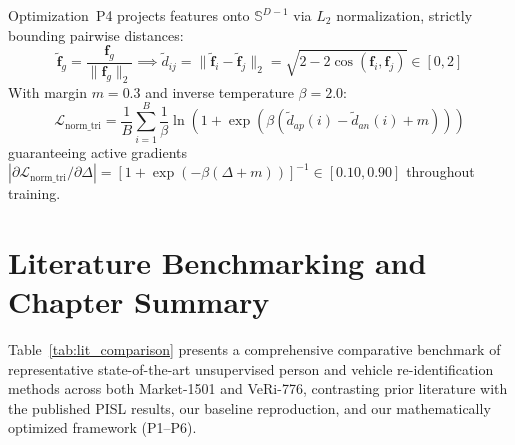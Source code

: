 Optimization~P4 projects features onto $\mathbb{S}^{D-1}$ via $L_2$ normalization, strictly bounding pairwise distances:
\begin{equation}
\label{eq:lit_l2_norm}
\tilde{\mathbf{f}}_g = \frac{\mathbf{f}_g}{\|\mathbf{f}_g\|_2} \implies \tilde{d}_{ij} = \|\tilde{\mathbf{f}}_i - \tilde{\mathbf{f}}_j\|_2 = \sqrt{2 - 2\cos(\mathbf{f}_i, \mathbf{f}_j)} \in [0, 2]
\end{equation}
With margin $m = 0.3$ and inverse temperature $\beta = 2.0$:
\begin{equation}
\label{eq:lit_norm_triplet_loss}
\mathcal{L}_{\text{norm\_tri}} = \frac{1}{B}\sum_{i=1}^B \frac{1}{\beta}\ln\left(1 + \exp\left(\beta(\tilde{d}_{ap}(i) - \tilde{d}_{an}(i) + m)\right)\right)
\end{equation}
guaranteeing active gradients $|\partial \mathcal{L}_{\text{norm\_tri}} / \partial \Delta| = [1 + \exp(-\beta(\Delta + m))]^{-1} \in [0.10, 0.90]$ \label{eq:lit_active_gradient} throughout training.

\section{Literature Benchmarking and Chapter Summary}
\label{sec:lit_summary}

Table~\ref{tab:lit_comparison} presents a comprehensive comparative benchmark of representative state-of-the-art unsupervised person and vehicle re-identification methods across both Market-1501 and VeRi-776, contrasting prior literature with the published PISL results, our baseline reproduction, and our mathematically optimized framework (P1--P6).

